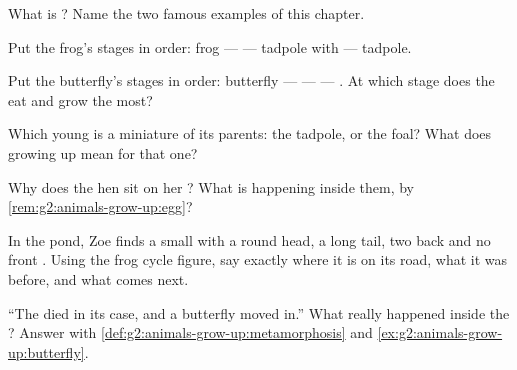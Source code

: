 \begin{exercise}[$\star$]\label{exo:g2:animals-grow-up:4}
What is ? Name the two famous examples of this
chapter.
\end{exercise}

\begin{exercise}[$\star$]\label{exo:g2:animals-grow-up:5}
Put the frog's stages in order: frog ---  --- tadpole with
 --- tadpole.
\end{exercise}

\begin{exercise}[$\star$]\label{exo:g2:animals-grow-up:6}
Put the butterfly's stages in order: butterfly ---  ---
 --- . At which stage does the  eat  and
grow the most?
\end{exercise}

\begin{exercise}[$\star$]\label{exo:g2:animals-grow-up:7}
Which young  is a miniature of its parents: the tadpole, or
the foal? What does growing up mean for that one?
\end{exercise}

\begin{exercise}[$\star$]\label{exo:g2:animals-grow-up:8}
Why does the hen sit on her ? What is happening inside them,
by \cref{rem:g2:animals-grow-up:egg}?
\end{exercise}

\begin{exercise}[$\star\star$]\label{exo:g2:animals-grow-up:9}
In the pond, Zoe finds a small  with a round head, a long
tail, two back  and no front . Using the frog cycle
figure, say exactly where it is on its road, what it was before,
and what comes next.
\end{exercise}

\begin{exercise}[$\star\star$]\label{exo:g2:animals-grow-up:10}
``The  died in its case, and a butterfly moved in.''
What really happened inside the ? Answer with
\cref{def:g2:animals-grow-up:metamorphosis} and
\cref{ex:g2:animals-grow-up:butterfly}.
\end{exercise}
